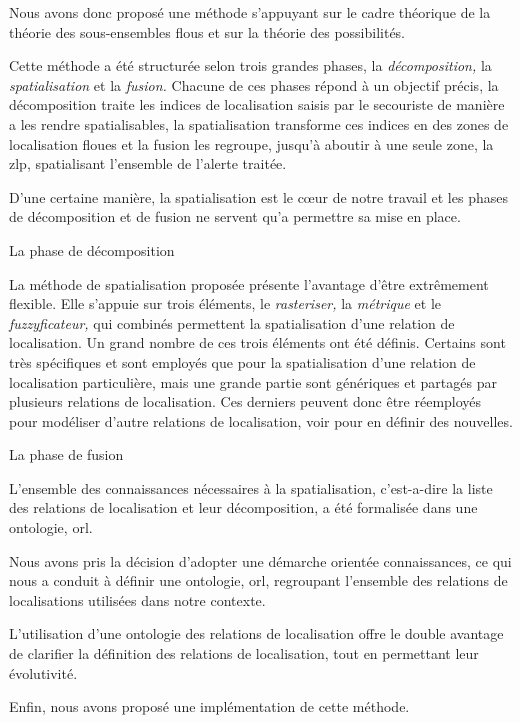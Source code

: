 Nous avons donc proposé une méthode s'appuyant sur le cadre théorique
de la théorie des sous-ensembles flous et sur la théorie des
possibilités.

Cette méthode a été structurée selon trois grandes phases, la
\emph{décomposition,} la \emph{spatialisation} et la \emph{fusion.}
Chacune de ces phases répond à un objectif précis, la décomposition
traite les indices de localisation saisis par le secouriste de manière
a les rendre spatialisables, la spatialisation transforme ces indices
en des zones de localisation floues et la fusion les regroupe, jusqu'à
aboutir à une seule zone, la \ac{zlp}, spatialisant l'ensemble de
l'alerte traitée.

D'une certaine manière, la spatialisation est le cœur de notre travail
et les phases de décomposition et de fusion ne servent qu'a permettre
sa mise en place.

La phase de décomposition

La méthode de spatialisation proposée présente l'avantage d'être
extrêmement flexible. Elle s'appuie sur trois éléments, le
\emph{rasteriser,} la \emph{métrique} et le \emph{fuzzyficateur,} qui
combinés permettent la spatialisation d'une relation de
localisation. Un grand nombre de ces trois éléments ont été
définis. Certains sont très spécifiques et sont employés que pour la
spatialisation d'une relation de localisation particulière, mais une
grande partie sont génériques et partagés par plusieurs relations de
localisation. Ces derniers peuvent donc être réemployés pour modéliser
d'autre relations de localisation, voir pour en définir des nouvelles.

La phase de fusion

L'ensemble des connaissances nécessaires à la spatialisation,
c'est-a-dire la liste des relations de localisation et leur
décomposition, a été formalisée dans une ontologie, \ac{orl}.



Nous avons pris la décision d'adopter une démarche orientée
connaissances, ce qui nous a conduit à définir une ontologie,
\ac{orl}, regroupant l'ensemble des relations de localisations
utilisées dans notre contexte.

L'utilisation d'une ontologie des relations de localisation offre le
double avantage de clarifier la définition des relations de
localisation, tout en permettant leur évolutivité.


Enfin, nous avons proposé une implémentation de cette méthode.

